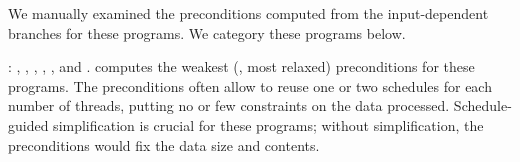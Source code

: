 




We manually examined the preconditions \peregrine computed from the
input-dependent branches for these programs.  We category these programs
below.

: \pbzip, \fft, \luc, \blackscholes, \swaptions,
  and \streamcluster. \peregrine computes the weakest (\ie, most relaxed) preconditions
  for these programs.  The preconditions often allow \peregrine to reuse
  one or two schedules for each number of threads, putting no
   or few constraints on the data processed.
  Schedule-guided simplification is crucial for
  these programs; without simplification, the preconditions
  would fix the data size and contents.


